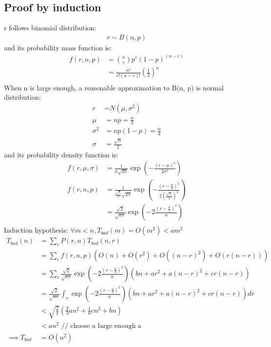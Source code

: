\documentclass{article}
\begin{document}
\subsection{Proof by induction}
r follows binomial distribution:
\begin{align*}
r \sim B(n, p)
\end{align*}
and its probability mass function is:
\begin{align*}
f(r, n, p)
&= \binom{n}{r}p^r(1-p)^{(n-r)}\\
&=\frac{n!}{r!(n-r)!}(\frac{1}{2})^n\\
\end{align*}
When n is large enough, a reasonable approximation to B(n, p) is normal
distribution:
\begin{align*}
r &\sim N(\mu, \sigma^2)\\
\mu &= np = \frac{n}{2} \\
\sigma^2 &= np(1-p) = \frac{n}{4}\\
\sigma &= \frac{\sqrt{n}}{2}
\end{align*}
and its probability density function is:
\begin{align*}
f(r, \mu, \sigma)
&= \frac{1}{\sigma \sqrt{2\pi}}\exp(-\frac{(r-\mu)^2}{2\sigma^2})\\
f(r, n, p)
&= \frac{1}{\frac{\sqrt{n}}{2}
\sqrt{2\pi}}\exp(-\frac{(r-\frac{n}{2})^2}{2(\frac{\sqrt{n}}{2})^2})\\
&=\frac{\sqrt{2}}{\sqrt{n\pi}}\exp(-2\frac{(r-\frac{n}{2})^2}{n})\\
\end{align*}
Induction hypothesis: $\forall m < n, T_{bad}(m) =
O(m^2) < am^2$
\begin{align*}
T_{bad}(n)
&= \sum_r P(r, n) T_{bad}(n,r)\\
&= \sum_r f(r, n, p) (O(n) + O(r^2) + O((n-r)^2) + O(r(n-r)))\\
&= \sum_r \frac{\sqrt{2}}{\sqrt{n\pi}}\exp(-2\frac{(r-\frac{n}{2})^2}{n})(bn +
ar^2 + a(n-r)^2 + cr(n-r))\\
&= \frac{\sqrt{2}}{\sqrt{n\pi}} \int_r \exp(-2\frac{(r-\frac{n}{2})^2}{n})(bn +
ar^2 + a(n-r)^2 + cr(n-r)) dr\\
&< \sqrt{\frac{2}{\pi}}(\frac{2}{3}an^2 + \frac{1}{6}cn^2 + bn)\\
&< an^2 \text{ // choose a large enough a} \\
\implies T_{bad} &= O(n^2)
\end{align*}
\end{document}
